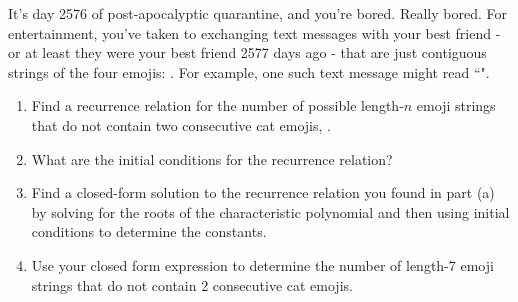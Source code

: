 \documentclass[11pt]{amsart}
\newcommand{\be}{\begin{enumerate}}
\newcommand{\ee}{\end{enumerate}}
\begin{document}
\item It's day 2576 of post-apocalyptic quarantine, and you're bored.  Really bored.  For entertainment, you've taken to exchanging text messages with your best friend - or at least they were your best friend 2577 days ago - that are just contiguous strings of the four emojis: {\LARGE \Winkey \Innocey \Cat \Coffeecup}.  For example, one such text message might read ``\Cat \Coffeecup \Winkey \Coffeecup \Innocey \Cat".
\be
\item Find a recurrence relation for the number of possible length-$n$ emoji strings that do not contain two consecutive cat emojis, {\LARGE\Cat\Cat}.
\item What are the initial conditions for the recurrence relation?
\item Find a closed-form solution to the recurrence relation you found in part (a) by solving for the roots of the characteristic polynomial and then using initial conditions to determine the constants.
\item Use your closed form expression to determine the number of length-7 emoji strings that do not contain 2 consecutive cat emojis.
\ee
\end{document}
